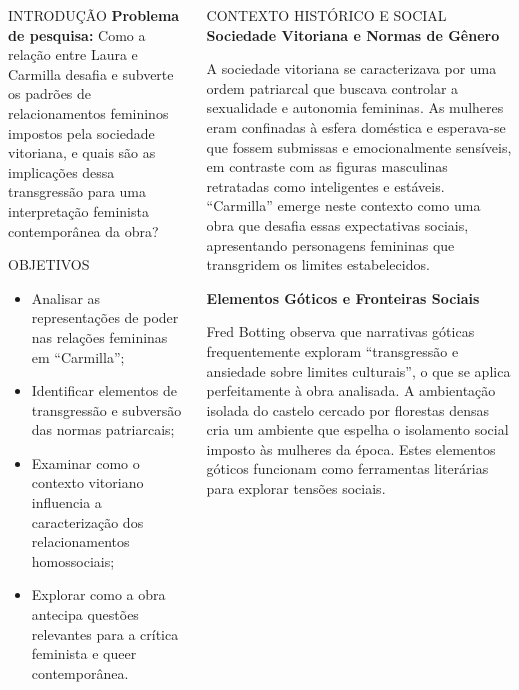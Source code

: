 \documentclass[final,a0paper,portrait]{beamer}
\begin{document}
\begin{frame}[t]
\begin{columns}[t]
\begin{column}{0.31\textwidth}
\begin{block}{\centering INTRODUÇÃO}
\vspace{0.5cm}
\textbf{Problema de pesquisa:} Como a relação entre Laura e Carmilla desafia e subverte os padrões de relacionamentos femininos impostos pela sociedade vitoriana, e quais são as implicações dessa transgressão para uma interpretação feminista contemporânea da obra?
\end{block}

\begin{block}{\centering OBJETIVOS}
\begin{itemize}
\item Analisar as representações de poder nas relações femininas em ``Carmilla'';
\item Identificar elementos de transgressão e subversão das normas patriarcais;
\item Examinar como o contexto vitoriano influencia a caracterização dos relacionamentos homossociais;
\item Explorar como a obra antecipa questões relevantes para a crítica feminista e queer contemporânea.
\end{itemize}
\end{block}
\end{column}

\begin{column}{0.33\textwidth}
\begin{block}{\centering CONTEXTO HISTÓRICO E SOCIAL}
\textbf{Sociedade Vitoriana e Normas de Gênero}

A sociedade vitoriana se caracterizava por uma ordem patriarcal que buscava controlar a sexualidade e autonomia femininas. As mulheres eram confinadas à esfera doméstica e esperava-se que fossem submissas e emocionalmente sensíveis, em contraste com as figuras masculinas retratadas como inteligentes e estáveis. ``Carmilla'' emerge neste contexto como uma obra que desafia essas expectativas sociais, apresentando personagens femininas que transgridem os limites estabelecidos.

\vspace{0.5cm}
\textbf{Elementos Góticos e Fronteiras Sociais}

Fred Botting observa que narrativas góticas frequentemente exploram ``transgressão e ansiedade sobre limites culturais'', o que se aplica perfeitamente à obra analisada. A ambientação isolada do castelo cercado por florestas densas cria um ambiente que espelha o isolamento social imposto às mulheres da época. Estes elementos góticos funcionam como ferramentas literárias para explorar tensões sociais.
\end{block}


\end{column}
\end{columns}
\end{frame}
\end{document}
